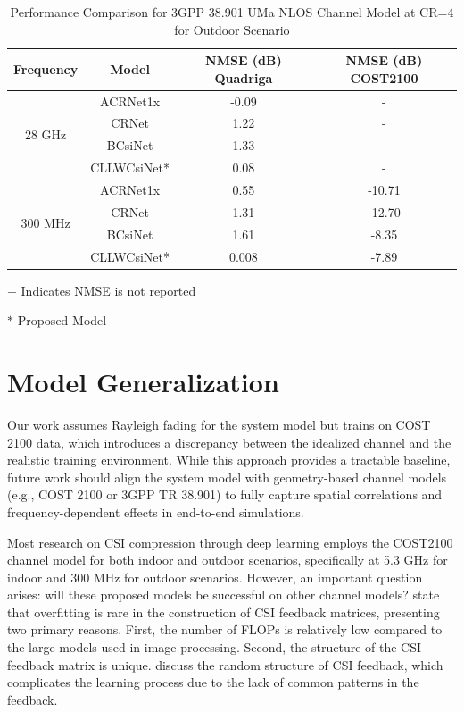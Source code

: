\documentclass[lettersize,journal]{IEEEtran}
\begin{document}
	
	\begin{table}[ht]
		\centering
		\caption{Performance Comparison for 3GPP 38.901 UMa NLOS Channel Model at CR=4 for Outdoor Scenario}
		\label{table:performance_comparison}
		\begin{threeparttable}
			\begin{tabular}{cccc}
				\toprule
				\textbf{Frequency} & \textbf{Model} & \textbf{NMSE (dB) Quadriga} & \textbf{NMSE (dB) COST2100} \\
				\midrule
				\multirow{4}{*}{28 GHz} & ACRNet1x\cite{abx} & -0.09 & - \\
				& CRNet\cite{abn} & 1.22 & - \\
				& BCsiNet\cite{abp} & 1.33 & - \\
				& CLLWCsiNet* & 0.08 & - \\
				\midrule
				\multirow{4}{*}{300 MHz} & ACRNet1x\cite{abx} & 0.55 & -10.71 \\
				& CRNet\cite{abn} & 1.31 & -12.70 \\
				& BCsiNet\cite{abp} & 1.61 & -8.35 \\
				& CLLWCsiNet* & 0.008 & -7.89 \\
				\bottomrule
			\end{tabular}
			\begin{tablenotes}
				\item[*] $ -$ Indicates NMSE is not reported
				\item[*] $ *$ Proposed Model
			\end{tablenotes}
		\end{threeparttable}
	\end{table}
	




\section{Model Generalization}


Our work assumes Rayleigh fading for the system model but trains on COST 2100 data, which introduces a discrepancy between the idealized channel and the realistic training environment. While this approach provides a tractable baseline, future work should align the system model with geometry-based channel models (e.g., COST 2100 or 3GPP TR 38.901) to fully capture spatial correlations and frequency-dependent effects in end-to-end simulations.

Most research on CSI compression through deep learning employs the COST2100 channel model for both indoor and outdoor scenarios, specifically at 5.3 GHz for indoor and 300 MHz for outdoor scenarios. However, an important question arises: will these proposed models be successful on other channel models?
\cite{abn} state that overfitting is rare in the construction of CSI feedback matrices, presenting two primary reasons. First, the number of FLOPs is relatively low compared to the large models used in image processing. Second, the structure of the CSI feedback matrix is unique. \cite{abx} discuss the random structure of CSI feedback, which complicates the learning process due to the lack of common patterns in the feedback.
\end{document}
